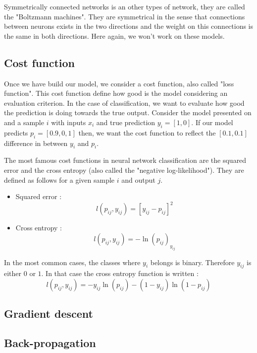 		Symmetrically connected networks is an other types of network, they are called the "Boltzmann machines". They are symmetrical in the sense that connections between neurons exists in the two directions and the weight on this connections is the same in both directions. Here again, we won't work on these models.


	

	\subsection{Cost function}
		Once we have build our model, we consider a cost function, also called "loss function". This cost function define how good is the model considering an evaluation criterion. In the case of classification, we want to evaluate how good the prediction is doing towards the true output. Consider the model presented on  and a sample $i$ with inputs $x_i$ and true prediction $y_i = [1,0]$. If our model predicts $p_i = [0.9,0,1]$ then, we want the cost function to reflect the $[0.1,0.1]$ difference in between $y_i$ and $p_i$.

		The most famous cost functions in neural network classification are the squared error and the cross entropy (also called the "negative log-likelihood"). They are defined as follows for a given sample $i$ and output $j$.
		\begin{itemize}
			\item Squared error : $$ l(p_{ij},y_{ij}) = \left[ y_{ij} - p_{ij} \right]^2 $$
			\item Cross entropy : $$ l(p_{ij},y_{ij}) = -\ln(p_{ij})_{y_{ij}}  $$
		\end{itemize}
		In the most common cases, the classes where $y_i$ belongs is binary. Therefore $y_{ij}$ is either $0$ or $1$. In that case the cross entropy function is written : 
		$$ l(p_{ij},y_{ij}) = - y_{ij}\ln(p_{ij}) - (1-y_{ij})\ln(1-p_{ij})  $$



	\subsection{Gradient descent}

		


	\subsection{Back-propagation}




